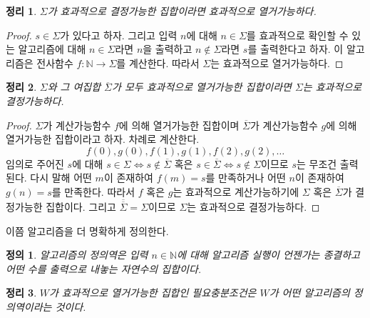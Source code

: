 \documentclass[a4paper,chapter,atbegshi]{oblivoir}
\newtheorem{defn}{정의}[chapter]
\newtheorem{theo}{정리}[chapter]
\begin{document}
\begin{theo}\label{theo:15}
  $\Sigma$가 효과적으로 결정가능한 집합이라면 효과적으로 열거가능하다.
\end{theo}
\begin{proof}
  $s\in\Sigma$가 있다고 하자. 그리고 입력 $n$에 대해 $n\in\Sigma$를 효과적으로
  확인할 수 있는 알고리즘에 대해 $n\in\Sigma$라면 $n$을 출력하고
  $n\notin\Sigma$라면 $s$를 출력한다고 하자. 이 알고리즘은 전사함수
  $f:\mathbb{N}\rightarrow\Sigma$를 계산한다. 따라서 $\Sigma$는 효과적으로
  열거가능하다.
\end{proof}
\begin{theo}
  $\Sigma$와 그 여집합 $\overline{\Sigma}$가 모두 효과적으로 열거가능한
  집합이라면 $\Sigma$는 효과적으로 결정가능하다.
\end{theo}
\begin{proof}
  $\Sigma$가 계산가능함수 $f$에 의해 열거가능한 집합이며 $\overline{\Sigma}$가
  계산가능함수 $g$에 의해 열거가능한 집합이라고 하자. 차례로 계산한다.
  \[
    f(0),g(0),f(1),g(1),f(2),g(2),\ldots
  \]
  임의로 주어진 $s$에 대해 $s\in\Sigma\iff s\notin\overline{\Sigma}$ 혹은
  $s\in\overline{\Sigma}\iff s\notin\Sigma$이므로
  $s$는 무조건 출력된다. 다시 말해 어떤 $m$이 존재하여 $f(m)=s$를 만족하거나
  어떤 $n$이 존재하여 $g(n)=s$를 만족한다. 따라서 $f$ 혹은 $g$는 효과적으로
  계산가능하기에 $\Sigma$ 혹은 $\overline{\Sigma}$가 결정가능한 집합이다. 그리고
  $\overline{\overline{\Sigma}}=\Sigma$이므로 $\Sigma$는 효과적으로 결정가능하다.
\end{proof}
이쯤 알고리즘을 더 명확하게 정의한다.
\begin{defn}
  알고리즘의 정의역은 입력 $n\in\mathbb{N}$에 대해 알고리즘 실행이 언젠가는
  종결하고 어떤 수를 출력으로 내놓는 자연수의 집합이다. 
\end{defn}
\begin{theo}
  $W$가 효과적으로 열거가능한 집합인 필요충분조건은 $W$가 어떤 알고리즘의
  정의역이라는 것이다.
\end{theo}
\end{document}
